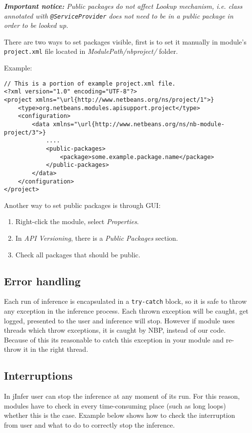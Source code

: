 \documentclass[a4paper,10pt,oneside]{article}
\begin{document}
\textit{
  \textbf{Important notice:} Public packages do not affect
  Lookup mechanism, i.e.
  class annotated with \texttt{@ServiceProvider}
  does not need to be in a public package in order to be looked up.
}
\par 
  There are two ways to set packages visible, first is to set it manually in
  module's \texttt{project.xml} file located in
  \textit{ModulePath/nbproject/} folder.

Example:
\begin{verbatim}
// This is a portion of example project.xml file.
<?xml version="1.0" encoding="UTF-8"?>
<project xmlns="\url{http://www.netbeans.org/ns/project/1">}
    <type>org.netbeans.modules.apisupport.project</type>
    <configuration>
        <data xmlns="\url{http://www.netbeans.org/ns/nb-module-project/3">}
            ....
            <public-packages>
                <package>some.example.package.name</package>
            </public-packages>
        </data>
    </configuration>
</project>
\end{verbatim}
\par 
  Another way to set public packages is through GUI:
  \begin{enumerate}
    \item Right-click the module, select \textit{Properties}.
    \item In \textit{API Versioning}, there is a \textit{Public Packages} section.
    \item Check all packages that should be public.
  \end{enumerate}

\subsection*{Error handling}
\par 
  Each run of inference is encapsulated in a \texttt{try-catch} block,
  so it is safe to throw any exception in the inference process.
  Each thrown exception will be caught, get logged, presented to the user and
  inference will stop. However if module uses threads which throw exceptions,
  it is caught by NBP, instead of our code. Because of this its reasonable to
  catch this exception in your module and re-throw it in the right thread.

\subsection*{Interruptions}
\par 
  In jInfer user can stop the inference at any moment of its run. For this
  reason, modules have to check in every time-consuming place (such as long loops)
  whether this is the case. Example below shows how to check the interruption
  from user and what to do to correctly stop the inference.
\end{document}
